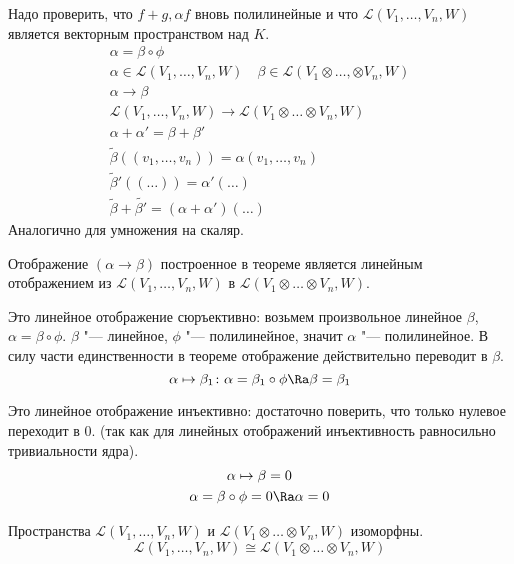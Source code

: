 \begin{description}
	Надо проверить, что $f+g, \alpha f$ вновь полилинейные и
	что $\mathcal L(V_1, \dots, V_n, W)$ является векторным пространством над $K$.
	\begin{gather*}
		\alpha = \beta \circ \phi \\
		\alpha \in \mathcal L(V_1, \dots, V_n, W) \quad
		\beta \in \mathcal L(V_1 \otimes \dots,\otimes V_n, W) \\
		\alpha \to \beta \\
		\mathcal L(V_1, \dots, V_n, W) \to \mathcal L(V_1 \otimes \dots \otimes V_n, W) \\
		\alpha + \alpha' = \beta + \beta' \\
		\tilde \beta((v_1, \dots, v_n)) = \alpha(v_1, \dots, v_n) \\
		\tilde \beta'((\dots)) = \alpha'(\dots) \\
		\tilde \beta + \tilde{\beta'} = (\alpha + \alpha')(\dots)
	\end{gather*}
	Аналогично для умножения на скаляр.

	Отображение $(\alpha \to \beta)$ построенное в теореме является линейным отображением из
	$\mathcal L(V_1, \dots, V_n, W)$  в $\mathcal L(V_1 \otimes \dots \otimes V_n, W)$.

	Это линейное отображение сюръективно:
	возьмем произвольное линейное $\beta$, $\alpha = \beta \circ \phi$.
	$\beta$ "--- линейное, $\phi$ "--- полилинейное, значит $\alpha$ "--- полилинейное.
	В силу части единственности в теореме отображение действительно переводит в $\beta$.
	\[ \alpha \mapsto \beta_1 \colon \alpha = \beta_1 \circ \phi \Ra \beta = \beta_1 \]

	Это линейное отображение инъективно:
	достаточно поверить, что только нулевое переходит в 0.
	(так как для линейных отображений инъективность равносильно тривиальности ядра).
	\begin{gather*}
		\alpha \mapsto \beta = 0 \\
		\alpha = \beta \circ \phi = 0 \Ra \alpha = 0
	\end{gather*}

	\begin{conseq}
		Пространства $\mathcal L(V_1, \dots, V_n, W)$ и $\mathcal L(V_1 \otimes \dots \otimes V_n, W)$ изоморфны.
		\[ \mathcal L(V_1, \dots, V_n, W) \cong \mathcal L(V_1 \otimes \dots \otimes V_n, W) \]
	\end{conseq}
\end{description}

